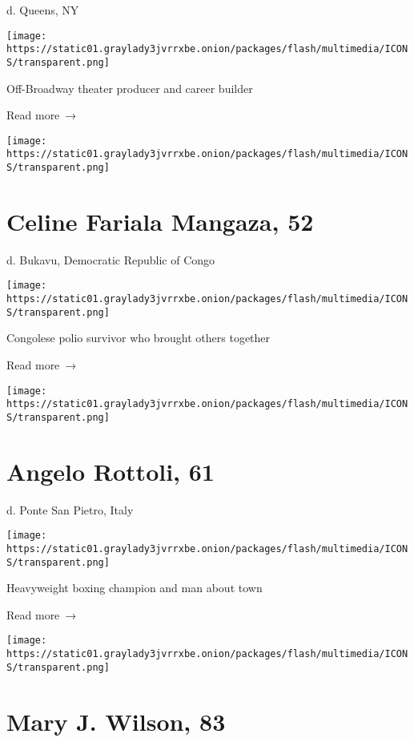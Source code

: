 d. Queens, NY

\texttt{[image: https://static01.graylady3jvrrxbe.onion/packages/flash/multimedia/ICONS/transparent.png]}

Off-Broadway theater producer and career builder

 Read more~→

\href{https://www.nytimes3xbfgragh.onion/2020/06/03/obituaries/mama-leki-dead-coronavirus.html}{}

\texttt{[image: https://static01.graylady3jvrrxbe.onion/packages/flash/multimedia/ICONS/transparent.png]}

\hypertarget{celine-fariala-mangaza-52}{%
\section{Celine Fariala Mangaza, 52}\label{celine-fariala-mangaza-52}}

d. Bukavu, Democratic Republic of Congo

\texttt{[image: https://static01.graylady3jvrrxbe.onion/packages/flash/multimedia/ICONS/transparent.png]}

Congolese polio survivor who brought others together

 Read more~→

\href{https://www.nytimes3xbfgragh.onion/2020/06/03/obituaries/angelo-rottoli-dead-coronavirus.html}{}

\texttt{[image: https://static01.graylady3jvrrxbe.onion/packages/flash/multimedia/ICONS/transparent.png]}

\hypertarget{angelo-rottoli-61}{%
\section{Angelo Rottoli, 61}\label{angelo-rottoli-61}}

d. Ponte San Pietro, Italy

\texttt{[image: https://static01.graylady3jvrrxbe.onion/packages/flash/multimedia/ICONS/transparent.png]}

Heavyweight boxing champion and man about town

 Read more~→

\href{https://www.nytimes3xbfgragh.onion/2020/06/02/us/mary-j-wilson-dead-coronavirus.html}{}

\texttt{[image: https://static01.graylady3jvrrxbe.onion/packages/flash/multimedia/ICONS/transparent.png]}

\hypertarget{mary-j-wilson-83}{%
\section{Mary J. Wilson, 83}\label{mary-j-wilson-83}}

